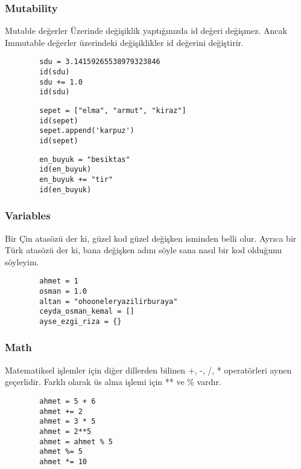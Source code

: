 \documentclass[10pt, compress]{beamer}
\begin{document}
\begin{frame}[fragile]
\frametitle{Mutability}
    \alert{Mutable} değerler Üzerinde değişiklik yaptığınızda \alert{id} değeri değişmez. Ancak \alert{Immutable} değerler üzerindeki değişiklikler \alert{id} değerini değiştirir.
    \begin{verbatim}
        sdu = 3.14159265538979323846
        id(sdu)
        sdu += 1.0
        id(sdu)
    \end{verbatim}      
    
    \begin{verbatim}
        sepet = ["elma", "armut", "kiraz"]
        id(sepet)
        sepet.append('karpuz')
        id(sepet)
    \end{verbatim}     

    \begin{verbatim}
        en_buyuk = "besiktas"
        id(en_buyuk)
        en_buyuk += "tir"
        id(en_buyuk)
    \end{verbatim}       
    
\end{frame}
\begin{frame}[fragile]
\frametitle{Variables}    
    Bir Çin atasözü der ki, \alert{güzel kod güzel değişken isminden belli olur}. Ayrıca bir Türk atasözü der ki, \alert{bana değişken adını söyle sana nasıl bir kod olduğunu söyleyim}.
    \begin{verbatim}
        ahmet = 1                           
        osman = 1.0                         
        altan = "ohooneleryazilirburaya"
        ceyda_osman_kemal = []              
        ayse_ezgi_riza = {}                 
    \end{verbatim}     
\end{frame}    


\begin{frame}[fragile]
\frametitle{Math}    
    Matematiksel işlemler için diğer dillerden bilinen \alert{+, -, /, *} operatörleri aynen geçerlidir. Farklı olarak üs alma işlemi için \alert{**}  ve \alert{\%} vardır.
    \begin{verbatim}
        ahmet = 5 + 6
        ahmet += 2
        ahmet = 3 * 5
        ahmet = 2**5
        ahmet = ahmet % 5
        ahmet %= 5
        ahmet *= 10
    \end{verbatim}      
\end{frame}  
\end{document}
